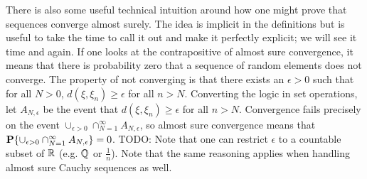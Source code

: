 There is also some useful technical intuition around how one might
prove that sequences converge almost surely.  The idea is implicit in
the definitions but is useful to take the time to call it out and make
it perfectly explicit; we will see it time and again.  If one looks at the contrapositive of almost
sure convergence, it means that there is probability zero that a
sequence of random elements does not converge.  The property of not
converging is that there exists an $\epsilon >0$ such that for all $N
> 0$, $d(\xi, \xi_n) \geq \epsilon$ for all $n > N$. Converting the
logic in set operations, let $A_{N, \epsilon}$ be the event that 
$d(\xi, \xi_n) \geq \epsilon$ for all $n > N$.  Convergence fails
precisely on the event $\cup_{\epsilon > 0} \cap_{N=1}^\infty A_{N,
  \epsilon}$, so almost sure convergence means that $\textbf{P}\{\cup_{\epsilon > 0} \cap_{N=1}^\infty A_{N,
  \epsilon}\} = 0$.  TODO: Note that one can restrict $\epsilon$ to a
countable subset of $\mathbb{R}$ (e.g. $\mathbb{Q}$ or $\frac{1}{n}$).  Note that the same reasoning applies when handling
almost sure Cauchy sequences as well.

